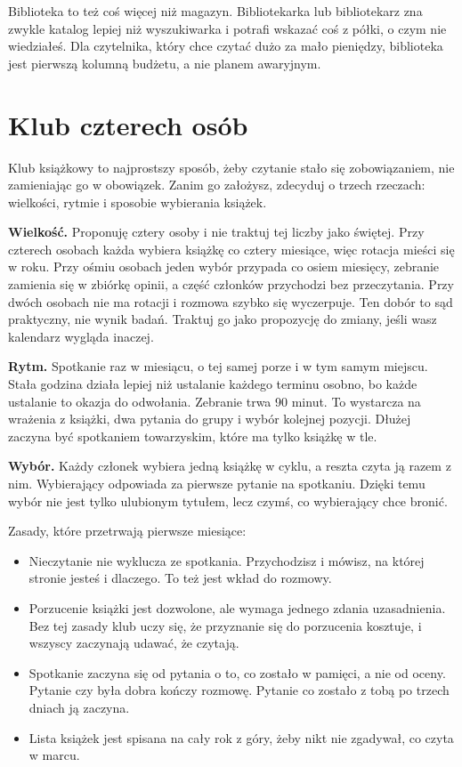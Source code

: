 Biblioteka to też coś więcej niż magazyn. Bibliotekarka lub bibliotekarz zna zwykle katalog lepiej niż wyszukiwarka i potrafi wskazać coś z półki, o czym nie wiedziałeś. Dla czytelnika, który chce czytać dużo za mało pieniędzy, biblioteka jest pierwszą kolumną budżetu, a nie planem awaryjnym.

\section{Klub czterech osób}

Klub książkowy to najprostszy sposób, żeby czytanie stało się zobowiązaniem, nie zamieniając go w obowiązek. Zanim go założysz, zdecyduj o trzech rzeczach: wielkości, rytmie i sposobie wybierania książek.

\textbf{Wielkość.} Proponuję cztery osoby i nie traktuj tej liczby jako świętej. Przy czterech osobach każda wybiera książkę co cztery miesiące, więc rotacja mieści się w roku. Przy ośmiu osobach jeden wybór przypada co osiem miesięcy, zebranie zamienia się w zbiórkę opinii, a część członków przychodzi bez przeczytania. Przy dwóch osobach nie ma rotacji i rozmowa szybko się wyczerpuje. Ten dobór to sąd praktyczny, nie wynik badań. Traktuj go jako propozycję do zmiany, jeśli wasz kalendarz wygląda inaczej.

\textbf{Rytm.} Spotkanie raz w miesiącu, o tej samej porze i w tym samym miejscu. Stała godzina działa lepiej niż ustalanie każdego terminu osobno, bo każde ustalanie to okazja do odwołania. Zebranie trwa 90 minut. To wystarcza na wrażenia z książki, dwa pytania do grupy i wybór kolejnej pozycji. Dłużej zaczyna być spotkaniem towarzyskim, które ma tylko książkę w tle.

\textbf{Wybór.} Każdy członek wybiera jedną książkę w cyklu, a reszta czyta ją razem z nim. Wybierający odpowiada za pierwsze pytanie na spotkaniu. Dzięki temu wybór nie jest tylko ulubionym tytułem, lecz czymś, co wybierający chce bronić.

Zasady, które przetrwają pierwsze miesiące:
\begin{itemize}
\item Nieczytanie nie wyklucza ze spotkania. Przychodzisz i mówisz, na której stronie jesteś i dlaczego. To też jest wkład do rozmowy.
\item Porzucenie książki jest dozwolone, ale wymaga jednego zdania uzasadnienia. Bez tej zasady klub uczy się, że przyznanie się do porzucenia kosztuje, i wszyscy zaczynają udawać, że czytają.
\item Spotkanie zaczyna się od pytania o to, co zostało w pamięci, a nie od oceny. Pytanie \glqq czy była dobra\grqq{} kończy rozmowę. Pytanie \glqq co zostało z tobą po trzech dniach\grqq{} ją zaczyna.
\item Lista książek jest spisana na cały rok z góry, żeby nikt nie zgadywał, co czyta w marcu.
\end{itemize}

